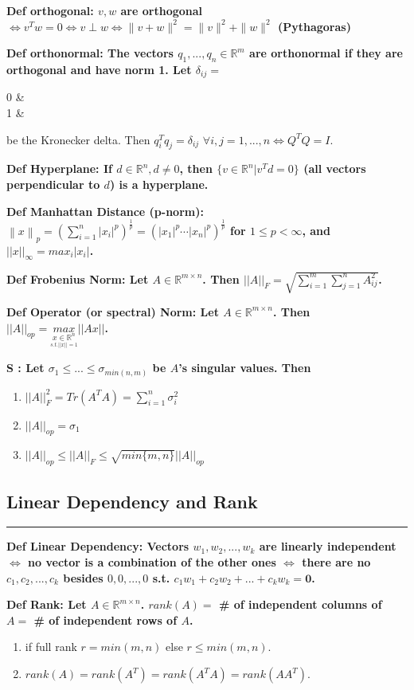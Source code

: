 \documentclass[7pt,landscape, margin = 0.1mm]{article}
\newcommand*{\mysubsection}[1]{\vspace{-2mm}\color{chaptercolor}\subsection{ #1 }
\vspace{-1mm}\hrule\vspace{1.5mm}\color{black}
\vspace{2mm}}
\newcommand{\DEF}[2]{\color{chaptercolor}\bf{Def #1}:\color{black}    \hspace{0.2cm} #2}
\newcommand{\SA}[2]{\color{chaptercolor}\bf{S #1}:\color{black}    \hspace{0.2cm} #2}
\begin{document}
\begin{multicols}{4}
\begin{flushleft}
{{\DEF{orthogonal}{$v,w$ are orthogonal $\Leftrightarrow v^Tw=0 \Leftrightarrow v \perp  w \Leftrightarrow \|v + w\|^2 =\|v\|^2 + \|w\|^2$ (Pythagoras)}

\DEF{orthonormal}{The vectors $q_1,...,q_n\in\mathbb{R}^m$ are orthonormal if they are orthogonal and have norm 1. Let $\delta_{ij}=$
\begin{cases}
    0 & \text{if $i\not=j$}\\
    1 & \text{if $i=j$}
\end{cases} be the Kronecker delta. Then $q_i^Tq_j=\delta_{ij}$ $\forall i,j=1,...,n \Leftrightarrow Q^TQ=I$.}

\DEF{Hyperplane}{If $d \in \mathbb{R}^n, d \not= 0$, then $\{v\in \mathbb{R}^n | v^Td=0\}$ (all vectors perpendicular to $d$) is a hyperplane.

\DEF{Manhattan Distance (p-norm)}{$\left\|x\right\|_p = (\sum_{i=1}^n|x_i|^p)^{\frac{1}{p}}=\left ( \left| x_1 \right|^p \cdots \left| x_n \right|^p \right )^{\frac{1}{p}}$ for $1\leq p < \infty$, and $||x||_\infty=max_i|x_i|$.}

\DEF{Frobenius Norm}{Let $A\in\mathbb{R}^{m\times n}$. Then $||A||_F=\sqrt{\sum_{i=1}^m\sum_{j=1}^nA_{ij}^2}$.}

\DEF{Operator (or spectral) Norm}{Let $A\in\mathbb{R}^{m\times n}$. Then $||A||_{op}=\underset{\underset{s.t.||x||=1}{x\in\mathbb{R}^n}}{max}||Ax||$.}

\SA{}{Let $\sigma_1\leq...\leq\sigma_{min(n,m)}$ be $A$'s singular values. Then
\begin{enumerate}[nolistsep]
    \item $||A||_F^2=Tr(A^TA)=\sum_{i=1}^n\sigma_i^2$
    \item $||A||_{op}=\sigma_1$
    \item $||A||_{op}\leq||A||_F\leq\sqrt{min\{m,n\}}||A||_{op}$
\end{enumerate}}

\mysubsection{Linear Dependency and Rank}
\DEF{Linear Dependency}{Vectors $w_1, w_2, ..., w_k$ are linearly independent $\Leftrightarrow$ no vector is a combination of the other ones $\Leftrightarrow$ there are no $c_1, c_2, ...,c_k$ besides $0, 0, ..., 0$ s.t. $c_1w_1 + c_2w_2 + ... + c_kw_k = \bm{0}$.}

\DEF{Rank}{Let $A\in\mathbb{R}^{m\times n}$. $rank(A) =$ \# of independent columns of $A =$ \# of independent rows of $A$. \begin{enumerate}[nolistsep]
    \item if full rank\: $r=min(m,n)$ else $r \leq min(m,n)$.
    \item $rank(A)=rank(A^T)=rank(A^TA)=rank(AA^T)$.
\end{enumerate}}}

}}
\end{flushleft}
\end{multicols}
\end{document}
